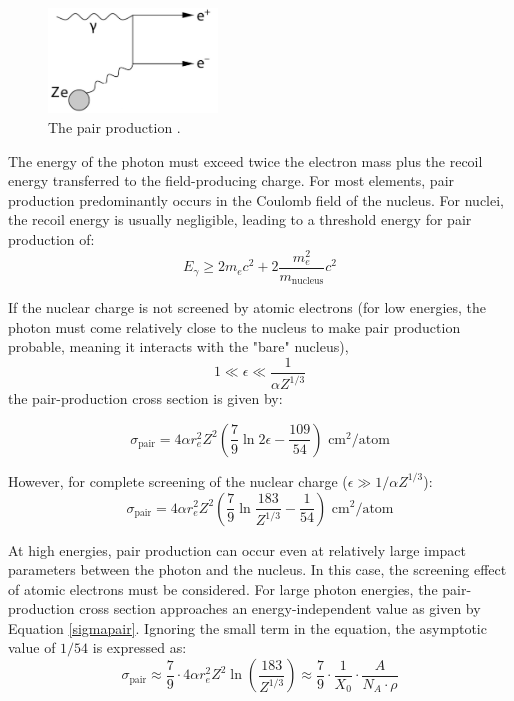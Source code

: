\begin{figure}[!h]
    \centering
    \includegraphics[width=0.4\textwidth]{figures/png/Screenshot_20240812_204755.png}
    \caption[The pair production.]{The pair production \cite{kola}.}
    \label{fig:pprod}
\end{figure}

The energy of the photon must exceed twice the electron 
mass plus the recoil energy transferred to the field-producing 
charge. For most elements, pair production predominantly 
occurs in the Coulomb field of the nucleus. For nuclei, 
the recoil energy is usually negligible, leading to a 
threshold energy for pair production of:
\begin{equation}
    E_{\gamma} \geq 2m_e c^2 + 2 \frac{m_e^2}{m_{\text{nucleus}}} c^2
\end{equation}

If the nuclear charge is not screened by atomic electrons 
(for low energies, the photon must come relatively close to 
the nucleus to make pair production probable, meaning it 
interacts with the "bare" nucleus),
\begin{equation}
    1 \ll \epsilon \ll \frac{1}{\alpha Z^{1/3}}
\end{equation}
the pair-production cross section is given by:

\begin{equation}
    \sigma_{\text{pair}} = 4 \alpha r_e^2 Z^2 \left(\frac{7}{9} \ln 2 \epsilon - \frac{109}{54}\right) \text{ cm}^2/\text{atom}
\end{equation}

However, for complete screening of the nuclear charge ($\epsilon \gg 1/\alpha Z^{1/3}$):
\begin{equation}\label{sigmapair}
    \sigma_{\text{pair}} = 4 \alpha r_e^2 Z^2 \left(\frac{7}{9} \ln \frac{183}{Z^{1/3}} - \frac{1}{54}\right) \text{ cm}^2/\text{atom}
\end{equation}

At high energies, pair production can occur even 
at relatively large impact parameters between the 
photon and the nucleus. In this case, the screening 
effect of atomic electrons must be considered. For 
large photon energies, the pair-production cross 
section approaches an energy-independent value as given by
 Equation \ref{sigmapair}. Ignoring the small term in the equation, 
 the asymptotic value of $1/54$ is expressed as:
\begin{equation}
    \sigma_{\text{pair}} \approx \frac{7}{9} \cdot 4 \alpha r_e^2 Z^2 \ln\left(\frac{183}{Z^{1/3}}\right) \approx \frac{7}{9} \cdot \frac{1}{X_0} \cdot \frac{A}{N_A \cdot \rho}
    \label{eq:paircross_radiationlength}
\end{equation}

